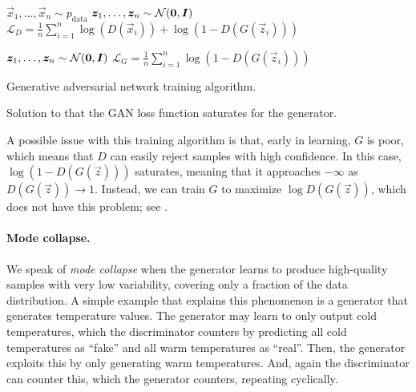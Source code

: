 \begin{algorithm}
    \begin{algorithmic}[1]
        \State $\vec{x}_1, \ldots, \vec{x}_n \sim p_{\mathrm{data}}$
        \State $\bm{z}_1, \ldots, \bm{z}_n \sim \mathcal{N}(\bm{0}, \bm{I})$
        \State $\mathcal{L}_D = \frac{1}{n} \sum_{i=1}^{n} \log (D(\vec{x}_i)) + \log(1 - D(G(\vec{z}_i)))$
        \End

        \State $\bm{z}_1, \ldots, \bm{z}_n \sim \mathcal{N}(\bm{0}, \bm{I})$
        \State $\mathcal{L}_G = \frac{1}{n} \sum_{i=1}^{n} \log(1 - D(G(\vec{z}_i)))$
        \EndWhile
    \end{algorithmic}
    \caption{Generative adversarial network training algorithm.}
    \label{alg:gan}
\end{algorithm}

\begin{marginfigure}
    \centering
    \caption{Solution to that the GAN loss function saturates for the generator.}
    \label{fig:gan-loss}
\end{marginfigure}

A possible issue with this training algorithm is that, early in learning, $G$ is poor, which means
that $D$ can easily reject samples with high confidence. In this case, $\log(1 - D(G(\vec{z})))$
saturates, meaning that it approaches $-\infty$ as $D(G(\vec{z})) \to 1$. Instead, we can train $G$
to maximize $\log D(G(\vec{z}))$, which does not have this problem; see .

\paragraph{Mode collapse.}

We speak of \textit{mode collapse} when the generator learns to produce high-quality samples with
very low variability, covering only a fraction of the data distribution. A simple example that
explains this phenomenon is a generator that generates temperature values. The generator may learn
to only output cold temperatures, which the discriminator counters by predicting all cold
temperatures as ``fake'' and all warm temperatures as ``real''. Then, the generator exploits this
by only generating warm temperatures. And, again the discriminator can counter this, which the
generator counters, repeating cyclically.

